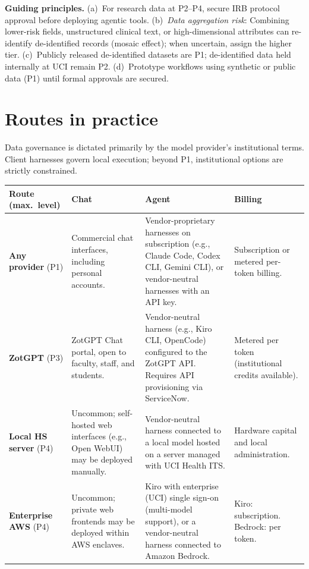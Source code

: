 \documentclass[10pt,letterpaper]{article}
\begin{document}
\vspace{3pt}
{\small\textbf{Guiding principles.} (a)~For research data at P2--P4, secure IRB protocol approval before deploying agentic tools.
(b)~\emph{Data aggregation risk}: Combining lower-risk fields, unstructured clinical text, or high-dimensional attributes can re-identify de-identified records (mosaic effect); when uncertain, assign the higher tier.
(c)~Publicly released de-identified datasets are P1; de-identified data held internally at UCI remain P2.
(d)~Prototype workflows using synthetic or public data (P1) until formal approvals are secured.}

\newpage
\section{Routes in practice}
Data governance is dictated primarily by the model provider's institutional terms. Client harnesses govern local execution; beyond P1, institutional options are strictly constrained.

\renewcommand{\arraystretch}{1.2}\small
\noindent\begin{tabularx}{\textwidth}{>{\raggedright\arraybackslash}p{1.0in}|>{\raggedright\arraybackslash}X|>{\raggedright\arraybackslash}X|>{\raggedright\arraybackslash}p{1.05in}}
\toprule
\textbf{Route (max.\ level)} & \textbf{Chat} & \textbf{Agent} & \textbf{Billing} \\
\midrule
\textbf{Any provider} (P1) &
Commercial chat interfaces, including personal accounts. &
Vendor-proprietary harnesses on subscription (e.g., Claude Code, Codex CLI, Gemini CLI), or vendor-neutral harnesses with an API key. &
Subscription or metered per-token billing. \\
\midrule
\textbf{ZotGPT} (P3) &
ZotGPT Chat portal, open to faculty, staff, and students. &
Vendor-neutral harness (e.g., Kiro CLI, OpenCode) configured to the ZotGPT API. Requires API provisioning via ServiceNow. &
Metered per token (institutional credits available). \\
\midrule
\textbf{Local HS server} (P4) &
Uncommon; self-hosted web interfaces (e.g., Open WebUI) may be deployed manually. &
Vendor-neutral harness connected to a local model hosted on a server managed with UCI Health ITS. &
Hardware capital and local administration. \\
\midrule
\textbf{Enterprise AWS} (P4) &
Uncommon; private web frontends may be deployed within AWS enclaves. &
Kiro with enterprise (UCI) single sign-on (multi-model support), or a vendor-neutral harness connected to Amazon Bedrock. &
Kiro: subscription. Bedrock: per token. \\
\bottomrule
\end{tabularx}\normalsize
\end{document}
